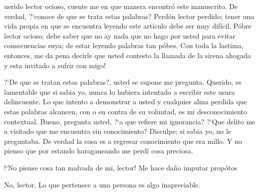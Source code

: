 \documentclass[12pt]{article}
\begin{document}
	\begin{multicols}{2}
		uerido lector ocioso, cuente me en que manera encontr\'{o} este manuscrito. De verdad, \mbox{?`}conoce de que se trata estas palabras? Perd\'{o}n lector perdido; tener una vida propia en que se encuentra leyendo este art\'{i}culo debe ser muy difícil. P\'{o}bre lector ocioso; debe saber que no ay nada que no hago por usted para evitar consecuencias suya; de estar leyendo palabras tan p\'{o}bes. Con toda la lastima, entonces, me da pena decirle que usted contesto la llamada de la sirena ahogada y esta invitado a sufrir con migo!
		
		\mbox{?`}De que se tratan estas palabras?, usted se supone me pregunta. Querido, es lamentable que si sabia yo, nunca lo hubiera intentado a escribir este usura delincuente. Lo que intento a demonstrar a usted y cualquier alma perdida que estas palabras alcancen, con o en contra de su voluntad, es mi desconocimiento contextual. Bueno, pregunta usted, \mbox{?`}a que refiere mi ignorancia? \mbox{?`}Que delito me a visitado que me encuentra sin conocimiento? Disculpe; si sabia yo, no le preguntaba. De verdad la cosa es a regresar conocimiento que era millo. Y no pienso que por estando haraganeando me perd\'{i} cosa preciosa.
		
		\mbox{!`}No piense cosa tan malvada de mi, lector! Me hace da\~{n}o imputar prop\'{o}tos
		
		No, lector. Lo que pertenece a una persona es algo inapreciable.
	\end{multicols}
	
	
	
\end{document}
